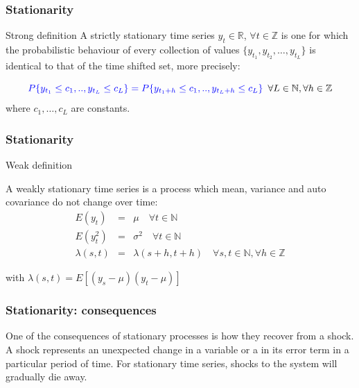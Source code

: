 \documentclass{beamer}
\begin{document}
\begin{frame}
\frametitle{Stationarity}
\begin{block}{Strong definition}
A strictly stationary time series $y_t \in \mathbb{R}$, $\forall t \in \mathbb{Z}$ is one for which the probabilistic behaviour of every collection of values $\{y_{t_1},y_{t_2},\dots,y_{t_L}\}$ is identical
to that of the time shifted set, more precisely:
\small

\begin{equation*}
{\color{blue}
P\{y_{t_1} \leq
c_1,..,y_{t_L} \leq c_L\} = P\{y_{t_1+h} \leq c_1,..,y_{t_L+h} \leq c_L\}\enspace }\forall L \in \mathbb{N}, \forall h \in \mathbb{Z}
\end{equation*}
\noindent where $c_1,\dots,c_L$ are constants.
\end{block}
\end{frame}

\begin{frame}
\frametitle{Stationarity}
\begin{block}{Weak definition}

A weakly stationary time series is a process which mean, variance and auto covariance do not change over time:
\small
{\color{blue}
 \begin{eqnarray*} E(y_t) &=& \mu  \quad
\forall t \in \mathbb{N} \\ E(y^2_t) &=& \sigma^2  \quad \forall t \in
\mathbb{N} \\ \lambda(s,t)&=&\lambda(s+h,t+h) \quad \forall s,t \in \mathbb{N},
\forall h \in \mathbb{Z} \end{eqnarray*}}
\end{block}
\noindent with $\lambda(s,t) = E[(y_s-\mu)(y_t - \mu)]$ 
\end{frame}

\begin{frame}
\frametitle{Stationarity: consequences}
One of the consequences of stationary processes is how they recover from a shock. A shock represents an unexpected change in a variable or a in its error term in a particular period of time. For stationary time series, shocks to the system will gradually die away. 
\end{frame}
\end{document}
